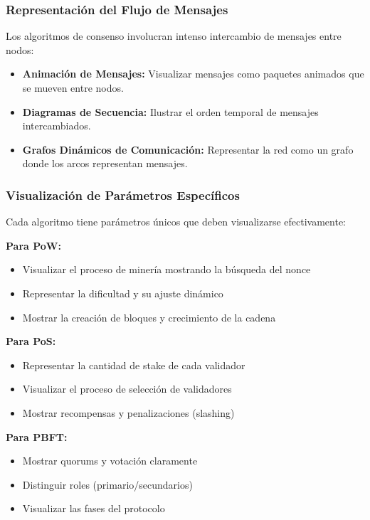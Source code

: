 \documentclass[spanish,12pt,letterpaper]{report}
\begin{document}
\subsubsection{Representación del Flujo de Mensajes}

Los algoritmos de consenso involucran intenso intercambio de mensajes entre nodos:

\begin{itemize}
    \item \textbf{Animación de Mensajes:} Visualizar mensajes como paquetes animados que se mueven entre nodos.
    \item \textbf{Diagramas de Secuencia:} Ilustrar el orden temporal de mensajes intercambiados.
    \item \textbf{Grafos Dinámicos de Comunicación:} Representar la red como un grafo donde los arcos representan mensajes.
\end{itemize}

\subsubsection{Visualización de Parámetros Específicos}

Cada algoritmo tiene parámetros únicos que deben visualizarse efectivamente:

\textbf{Para PoW:}
\begin{itemize}
    \item Visualizar el proceso de minería mostrando la búsqueda del nonce
    \item Representar la dificultad y su ajuste dinámico
    \item Mostrar la creación de bloques y crecimiento de la cadena
\end{itemize}

\textbf{Para PoS:}
\begin{itemize}
    \item Representar la cantidad de stake de cada validador
    \item Visualizar el proceso de selección de validadores
    \item Mostrar recompensas y penalizaciones (slashing)
\end{itemize}

\textbf{Para PBFT:}
\begin{itemize}
    \item Mostrar quorums y votación claramente
    \item Distinguir roles (primario/secundarios)
    \item Visualizar las fases del protocolo
\end{itemize}
\end{document}
